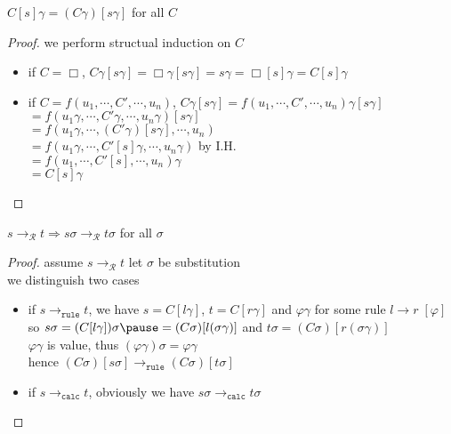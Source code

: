 \documentclass[12pt,aspectratio=169]{beamer}
\newcommand{\RR}{\mathcal{R}}
\newcommand{\torule}{\to_{\mathtt{rule}}}
\newcommand{\tocalc}{\to_{\mathtt{calc}}}
\begin{document}
\begin{frame}
    \begin{lemma}
        $C[s]\gamma = (C\gamma)[s\gamma]$ for all $C$
    \end{lemma}
    \pause
    \begin{proof}
        we perform structual induction on $C$\\ \pause
        \begin{itemize} \pause
            \item if $C = \Box$, \pause
                $C\gamma[s\gamma] = \Box\gamma[s\gamma] = s\gamma = \Box[s]\gamma = C[s]\gamma$
            \pause
            \item if $C = f(u_1,\cdots,C',\cdots,u_n)$, \pause
                $C\gamma[s\gamma] = f(u_1,\cdots,C',\cdots,u_n)\gamma[s\gamma]$\\
                \pause
                $= f(u_1\gamma,\cdots,C'\gamma,\cdots,u_n\gamma)[s\gamma]$ \\
                \pause
                $= f(u_1\gamma, \cdots, (C'\gamma)[s\gamma],\cdots,u_n)$\\
                \pause
                $= f(u_1\gamma, \cdots, C'[s]\gamma,\cdots,u_n\gamma)$ by I.H. \\
                \pause
                $= f(u_1, \cdots, C'[s], \cdots, u_n)\gamma$\\
                \pause
                $= C[s]\gamma$
        \end{itemize}
    \end{proof}
\end{frame}

\begin{frame}
    \begin{theorem}
            $s \to_{\RR} t \Rightarrow s\sigma \to_{\RR} t\sigma$ for all $\sigma$
    \end{theorem}
    \begin{proof}
        assume $s \to_{\RR} t$ \pause \quad
        let $\sigma$ be substitution\\ we distinguish two cases \pause
        \begin{itemize}
            \item if $s \torule t$,
                \pause
                we have $s=C[l\gamma]$, $t=C[r\gamma]$ and $\varphi\gamma$ for some rule $l \to r \; [\varphi]$\\
                \pause
                so $s\sigma = (C[l\gamma])\sigma \pause = (C\sigma)[l(\sigma\gamma)]$
                \pause and $t\sigma = (C\sigma)[r(\sigma\gamma)]$\\
                \pause
                $\varphi\gamma$ is value, thus $(\varphi\gamma)\sigma = \varphi\gamma$\\
                \pause
                hence $(C\sigma)[s\sigma] \torule (C\sigma)[t\sigma]$
            \pause
            \item if $s \tocalc t$, obviously we have $s\sigma \tocalc t\sigma$
        \end{itemize}
    \end{proof}
\end{frame}
\end{document}
